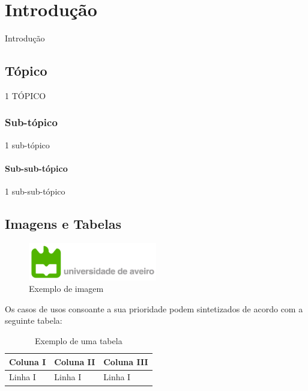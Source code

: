 \chapter{Introdução}
\label{chp:introduction}
Introdução
\section{Tópico}
1 TÓPICO
\subsection{Sub-tópico}
1 sub-tópico
\subsubsection{Sub-sub-tópico}
1 sub-sub-tópico

\section{Imagens e Tabelas}
\begin{figure}[!ht]
    \centering
    \includegraphics[width=0.5\textwidth]{images/ua.png}
    \caption{Exemplo de imagem}
    \label{fig:example}
\end{figure}
Os casos de usos consoante a sua prioridade podem sintetizados de acordo com a seguinte tabela:
\begin{table}[ht]
    \centering
        \begin{tabular}{p{}p{}p{}}
            \hline
            \textbf{Coluna I} &	\textbf{Coluna II} &	\textbf{Coluna III} \\ 
            \hline
            Linha I & Linha I & Linha I \\
            \hline
        \end{tabular}
    \caption{Exemplo de uma tabela}
    \label{myTable}
\end{table}

